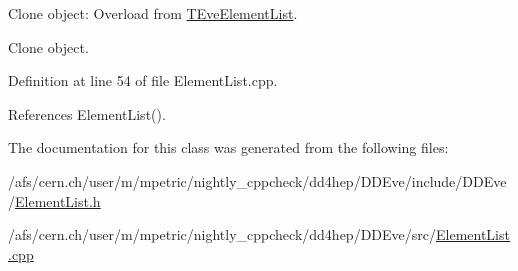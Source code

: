 Clone object\+: Overload from \hyperlink{class_t_eve_element_list}{T\+Eve\+Element\+List}. 

Clone object. 

Definition at line 54 of file Element\+List.\+cpp.



References Element\+List().



The documentation for this class was generated from the following files\+:\begin{DoxyCompactItemize}
\item 
/afs/cern.\+ch/user/m/mpetric/nightly\+\_\+cppcheck/dd4hep/\+D\+D\+Eve/include/\+D\+D\+Eve/\hyperlink{_element_list_8h}{Element\+List.\+h}\item 
/afs/cern.\+ch/user/m/mpetric/nightly\+\_\+cppcheck/dd4hep/\+D\+D\+Eve/src/\hyperlink{_element_list_8cpp}{Element\+List.\+cpp}\end{DoxyCompactItemize}
